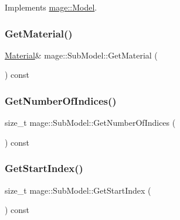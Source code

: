 Implements \hyperlink{classmage_1_1_model_ae5e9bee52da0db8c7a29920c13ed40ea}{mage\+::\+Model}.

\hypertarget{classmage_1_1_sub_model_af993f41f73a72df9fca154083c5f7410}{}\label{classmage_1_1_sub_model_af993f41f73a72df9fca154083c5f7410} 
\subsubsection{\texorpdfstring{Get\+Material()}{GetMaterial()}}
{\footnotesize\ttfamily \hyperlink{structmage_1_1_material}{Material}\& mage\+::\+Sub\+Model\+::\+Get\+Material (\begin{DoxyParamCaption}{ }\end{DoxyParamCaption}) const}

\hypertarget{classmage_1_1_sub_model_a18736678fc1a5d882776298053e037b3}{}\label{classmage_1_1_sub_model_a18736678fc1a5d882776298053e037b3} 
\subsubsection{\texorpdfstring{Get\+Number\+Of\+Indices()}{GetNumberOfIndices()}}
{\footnotesize\ttfamily size\+\_\+t mage\+::\+Sub\+Model\+::\+Get\+Number\+Of\+Indices (\begin{DoxyParamCaption}{ }\end{DoxyParamCaption}) const}

\hypertarget{classmage_1_1_sub_model_a2b901cb62dca26a7ff399719e0a4ba66}{}\label{classmage_1_1_sub_model_a2b901cb62dca26a7ff399719e0a4ba66} 
\subsubsection{\texorpdfstring{Get\+Start\+Index()}{GetStartIndex()}}
{\footnotesize\ttfamily size\+\_\+t mage\+::\+Sub\+Model\+::\+Get\+Start\+Index (\begin{DoxyParamCaption}{ }\end{DoxyParamCaption}) const}

